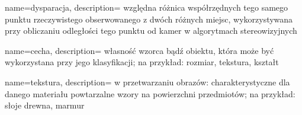 {
    name=dysparacja,
    description={
        względna różnica współrzędnych tego samego punktu rzeczywistego obserwowanego
        z dwóch różnych miejsc, wykorzystywana przy obliczaniu odległości tego punktu
        od kamer w algorytmach stereowizyjnych
    }
}

{
    name=cecha,
    description={
        własność wzorca bądź obiektu, która może być wykorzystana przy jego klasyfikacji;
        na przykład: rozmiar, tekstura, kształt
    }
}

{
    name=tekstura,
    description={
        w przetwarzaniu obrazów: charakterystyczne dla danego materiału powtarzalne
        wzory na powierzchni przedmiotów; na przykład: słoje drewna, marmur
    }
}

